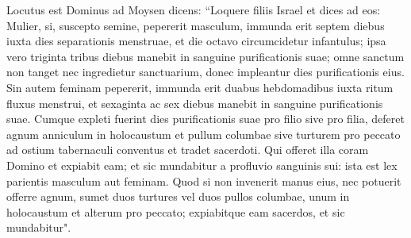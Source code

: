 \begin{biblechapter}  
\verse Locutus est Dominus ad Moysen dicens: 
\verse “Loquere filiis Israel et dices ad eos: Mulier, si, suscepto semine, pepererit masculum, immunda erit septem diebus iuxta dies separationis menstruae, 
\verse et die octavo circumcidetur infantulus; 
\verse ipsa vero triginta tribus diebus manebit in sanguine purificationis suae; omne sanctum non tanget nec ingredietur sanctuarium, donec impleantur dies purificationis eius. 
\verse Sin autem feminam pepererit, immunda erit duabus hebdomadibus iuxta ritum fluxus menstrui, et sexaginta ac sex diebus manebit in sanguine purificationis suae. 
\verse Cumque expleti fuerint dies purificationis suae pro filio sive pro filia, deferet agnum anniculum in holocaustum et pullum columbae sive turturem pro peccato ad ostium tabernaculi conventus et tradet sacerdoti. 
\verse Qui offeret illa coram Domino et expiabit eam; et sic mundabitur a profluvio sanguinis sui: ista est lex parientis masculum aut feminam. 
\verse Quod si non invenerit manus eius, nec potuerit offerre agnum, sumet duos turtures vel duos pullos columbae, unum in holocaustum et alterum pro peccato; expiabitque eam sacerdos, et sic mundabitur". 
\end{biblechapter}

